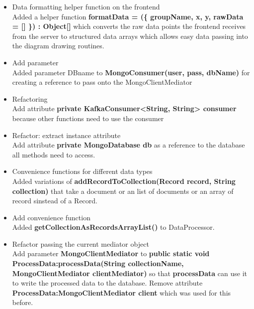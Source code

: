 \documentclass[oneside, english, final]{design}
\begin{document}
\begin{itemize}
      \item{Data formatting helper function on the frontend
            \\
            Added a helper function \textsf{\textbf{formatData = (\{ groupName, x, y, rawData = [] \}) : Object[] }} which converts the raw data points the frontend receives from the server to structured data arrays which allows easy data passing into the diagram drawing routines.}

      \item{Add parameter
            \\
            Added parameter DBname to \textsf{\textbf{MongoConsumer(user, pass, dbName)}} for creating a reference to pass onto the MongoClientMediator}

      \item{Refactoring
            \\
            Add attribute \textsf{\textbf{private KafkaConsumer<String, String> consumer}} because other functions need to use the consumer}

      \item{Refactor: extract instance attribute}
            \\
            Add attribute \textsf{\textbf{private MongoDatabase db}}
            as a reference to the database all methods need to access.

      \item{Convenience functions for different data types}
            \\
            Added variations of \textsf{\textbf{addRecordToCollection(Record record, String collection)}}
            that take a document or an list of documents or an array of record sinstead of a Record.


      \item{Add convenience function}
            \\
            Added \textsf{\textbf{getCollectionAsRecordsArrayList()}}
            to DataProcessor.

      \item{Refactor passing the current mediator object}
            \\
            Add parameter \textsf{\textbf{MongoClientMediator}} to \textsf{\textbf{public static void ProcessData:processData(String collectionName, MongoClientMediator clientMediator)}} so that \textsf{\textbf{processData}} can use it to write the processed data to the database. Remove attribute \textsf{\textbf{ProcessData:MongoClientMediator client}} which was used for this before.



\end{itemize}
\end{document}

